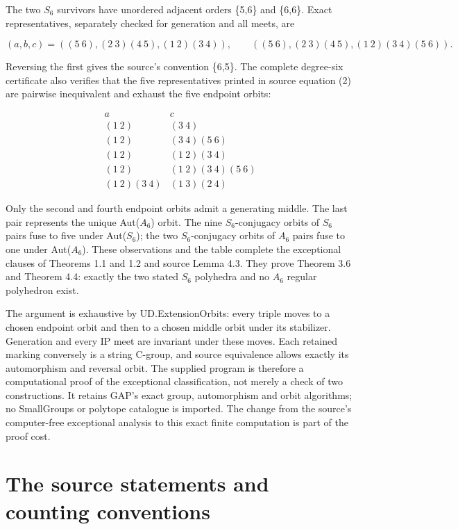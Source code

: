 The two \(S_6\) survivors have unordered adjacent orders \{5,6\} and
\{6,6\}. Exact representatives, separately checked for generation and
all meets, are

\[
 (a,b,c)=((5\ 6),(2\ 3)(4\ 5),(1\ 2)(3\ 4)),\qquad
 ((5\ 6),(2\ 3)(4\ 5),(1\ 2)(3\ 4)(5\ 6)).
 \tag{CPI11}
\]

Reversing the first gives the source's convention \{6,5\}. The complete
degree-six certificate also verifies that the five representatives
printed in source equation (2) are pairwise inequivalent and exhaust the
five endpoint orbits:

\[
 \begin{array}{c|c}
 a&c\\\hline
 (1\ 2)&(3\ 4)\\
 (1\ 2)&(3\ 4)(5\ 6)\\
 (1\ 2)&(1\ 2)(3\ 4)\\
 (1\ 2)&(1\ 2)(3\ 4)(5\ 6)\\
 (1\ 2)(3\ 4)&(1\ 3)(2\ 4)
 \end{array}
 \tag{CPI12}
\]

Only the second and fourth endpoint orbits admit a generating middle.
The last pair represents the unique Aut(\(A_6\)) orbit. The nine
\(S_6\)-conjugacy orbits of \(S_6\) pairs fuse to five under
Aut(\(S_6\)); the two \(S_6\)-conjugacy orbits of \(A_6\) pairs fuse to
one under Aut(\(A_6\)). These observations and the table complete the
exceptional clauses of Theorems 1.1 and 1.2 and source Lemma 4.3. They
prove Theorem 3.6 and Theorem 4.4: exactly the two stated \(S_6\)
polyhedra and no \(A_6\) regular polyhedron exist.

The argument is exhaustive by UD.ExtensionOrbits: every triple moves to
a chosen endpoint orbit and then to a chosen middle orbit under its
stabilizer. Generation and every IP meet are invariant under these
moves. Each retained marking conversely is a string C-group, and source
equivalence allows exactly its automorphism and reversal orbit. The
supplied program is therefore a computational proof of the exceptional
classification, not merely a check of two constructions. It retains
GAP's exact group, automorphism and orbit algorithms; no SmallGroups or
polytope catalogue is imported. The change from the source's
computer-free exceptional analysis to this exact finite computation is
part of the proof cost.

\section{The source statements and counting
conventions}\label{the-source-statements-and-counting-conventions}

